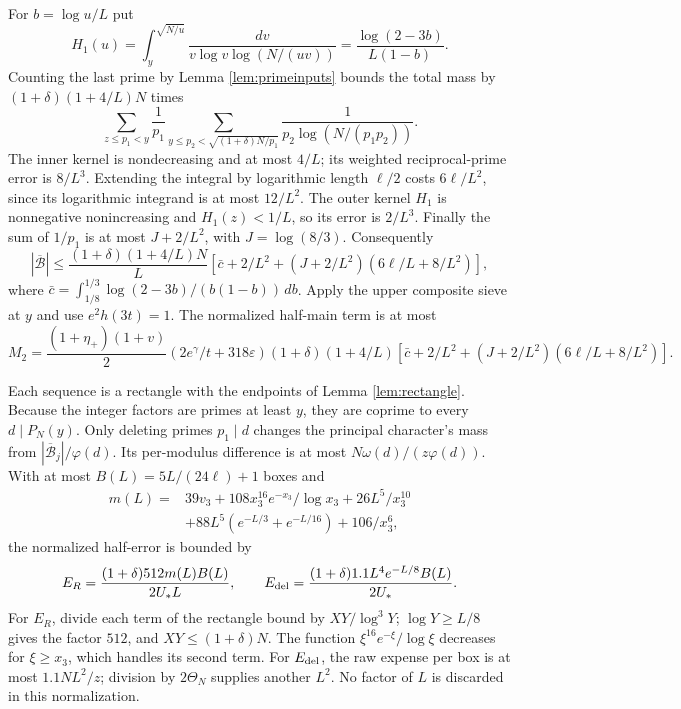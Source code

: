 \documentclass[11pt]{article}
\theoremstyle{remark}\newtheorem{remark}[theorem]{Remark}
\newcommand{\B}{\mathcal B}
\newcommand{\Th}{\Theta_N}
\newcommand{\eps}{\varepsilon}
\begin{document}
For $b=\log u/L$ put
\[
H_1(u)=\int_y^{\sqrt{N/u}}\frac{dv}{v\log v\log(N/(uv))}
=\frac{\log(2-3b)}{L(1-b)}.
\]
Counting the last prime by Lemma \ref{lem:primeinputs} bounds the total
mass by $(1+\delta)(1+4/L)N$ times
\[
\sum_{z\le p_1<y}\frac1{p_1}
\sum_{y\le p_2<\sqrt{(1+\delta)N/p_1}}
\frac1{p_2\log(N/(p_1p_2))}.
\]
The inner kernel is nondecreasing and at most $4/L$; its weighted
reciprocal-prime error is $8/L^3$. Extending the integral by logarithmic
length $\ell/2$ costs $6\ell/L^2$, since its logarithmic integrand is
at most $12/L^2$. The outer kernel $H_1$ is nonnegative nonincreasing
and $H_1(z)<1/L$, so its error is $2/L^3$. Finally the sum of $1/p_1$
is at most $J+2/L^2$, with $J=\log(8/3)$.
Consequently
\[
|\overline{\B}|\le\frac{(1+\delta)(1+4/L)N}{L}
\left[\bar c+2/L^2+(J+2/L^2)(6\ell/L+8/L^2)\right],
\]
where
$\bar c=\int_{1/8}^{1/3}\log(2-3b)/(b(1-b))\,db$.
Apply the upper composite sieve at $y$ and use $e^2h(3t)=1$.
The normalized half-main term is at most
\begin{equation}\label{eq:M2}
M_2=\frac{(1+\eta_+)(1+v)}2(2e^\gamma/t+318\eps)
(1+\delta)(1+4/L)
\left[\bar c+2/L^2+(J+2/L^2)(6\ell/L+8/L^2)\right].
\end{equation}

Each sequence is a rectangle with the endpoints of Lemma \ref{lem:rectangle}.
Because the integer factors are primes at least $y$, they are coprime
to every $d\mid P_N(y)$. Only deleting primes $p_1\mid d$ changes the
principal character's mass from $|\overline{\B}_j|/\varphi(d)$.
Its per-modulus difference is at most $N\omega(d)/(z\varphi(d))$.
With at most $B(L)=5L/(24\ell)+1$ boxes and
\begin{align*}
m(L)={}&39v_3+108x_3^{16}e^{-x_3}/\log x_3+26L^5/x_3^{10}\\
&+88L^5(e^{-L/3}+e^{-L/16})+106/x_3^6,
\end{align*}
the normalized half-error is bounded by
\begin{equation}\label{eq:Erect}
E_R=\frac{(1+\delta)512m(L)B(L)}{2U_*L},\qquad
E_{\rm del}=\frac{(1+\delta)1.1L^4e^{-L/8}B(L)}{2U_*}.
\end{equation}
For $E_R$, divide each term of the rectangle bound by $XY/\log^3Y$;
$\log Y\ge L/8$ gives the factor $512$, and $XY\le(1+\delta)N$.
The function $\xi^{16}e^{-\xi}/\log\xi$ decreases for $\xi\ge x_3$,
which handles its second term. For $E_{\rm del}$, the raw expense per
box is at most $1.1NL^2/z$; division by $2\Th$ supplies another $L^2$.
No factor of $L$ is discarded in this normalization.
\end{document}
